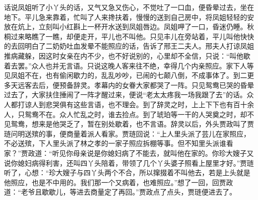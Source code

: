 


\begin{parag}
    话说凤姐听了小丫头的话，又气又急又伤心，不觉吐了一口血，便昏晕过去，坐在地下。平儿急来靠着，忙叫了人来搀扶着，慢慢的送到自己房中，将凤姐轻轻的安放在炕上，立刻叫小红斟上一杯开水送到凤姐唇边。凤姐呷了一口，昏迷仍睡。秋桐过来略瞧了一瞧，却便走开，平儿也不叫他。只见丰儿在旁站着，平儿叫他快快的去回明白了二奶奶吐血发晕不能照应的话，告诉了邢王二夫人。邢夫人打谅凤姐推病藏躲，因这时女亲在内不少，也不好说别的，心里却不全信，只说：“叫他歇着去罢。”众人也并无言语。只说这晚人客来往不绝，幸得几个内亲照应。家下人等见凤姐不在，也有偷闲歇力的，乱乱吵吵，已闹的七颠八倒，不成事体了。到二更多天远客去后，便预备辞灵。孝幕内的女眷大家都哭了一阵。只见鸳鸯已哭的昏晕过去了，大家扶住捶闹了一阵才醒过来，便说“老太太疼我一场我跟了去”的话。众人都打谅人到悲哭俱有这些言语，也不理会。到了辞灵之时，上上下下也有百十余人，只鸳鸯不在。众人忙乱之时，谁去捡点。到了琥珀等一干的人哭奠之时，却不见鸳鸯，想来是他哭乏了，暂在别处歇着，也不言语。辞灵以后，外头贾政叫了贾琏问明送殡的事，便商量着派人看家。贾琏回说：“上人里头派了芸儿在家照应，不必送殡，下人里头派了林之孝的一家子照应拆棚等事。但不知里头派谁看家？”贾政道：“听见你母亲说是你媳妇病了不能去，就叫他在家的。你珍大嫂子又说你媳妇病得利害，还叫四丫头陪着，带领了几个丫头婆子照看上屋里才好。”贾琏听了，心想：“珍大嫂子与四丫头两个不合，所以撺掇着不叫他去，若是上头就是他照应，也是不中用的。我们那一个又病着，也难照应。”想了一回，回贾政道：“老爷且歇歇儿，等进去商量定了再回。”贾政点了点头，贾琏便进去了。
\end{parag}



